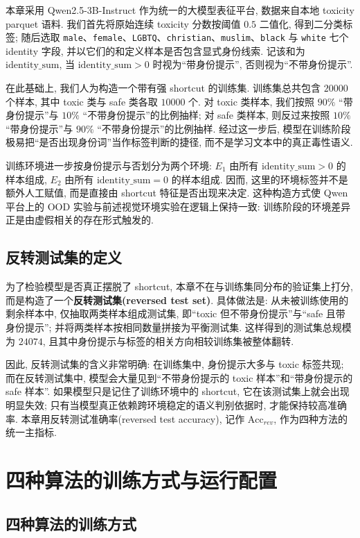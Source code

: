 \documentclass[a4paper,punct=banjiao,twoside]{ctexrep}
\theoremstyle{plain}
\theoremstyle{definition}
\theoremstyle{remark}
\begin{document}
本章采用 Qwen2.5-3B-Instruct 作为统一的大模型表征平台, 数据来自本地 toxicity parquet 语料. 我们首先将原始连续 toxicity 分数按阈值 $0.5$ 二值化, 得到二分类标签; 随后选取 \texttt{male}、\texttt{female}、\texttt{LGBTQ}、\texttt{christian}、\texttt{muslim}、\texttt{black} 与 \texttt{white} 七个 identity 字段, 并以它们的和定义样本是否包含显式身份线索. 记该和为 $\text{identity\_sum}$, 当 $\text{identity\_sum}>0$ 时视为“带身份提示”, 否则视为“不带身份提示”.

在此基础上, 我们人为构造一个带有强 shortcut 的训练集. 训练集总共包含 $20000$ 个样本, 其中 toxic 类与 safe 类各取 $10000$ 个. 对 toxic 类样本, 我们按照 $90\%$ “带身份提示”与 $10\%$ “不带身份提示”的比例抽样; 对 safe 类样本, 则反过来按照 $10\%$ “带身份提示”与 $90\%$ “不带身份提示”的比例抽样. 经过这一步后, 模型在训练阶段极易把“是否出现身份词”当作标签判断的捷径, 而不是学习文本中的真正毒性语义.

训练环境进一步按身份提示与否划分为两个环境: $E_1$ 由所有 $\text{identity\_sum}>0$ 的样本组成, $E_2$ 由所有 $\text{identity\_sum}=0$ 的样本组成. 因而, 这里的环境标签并不是额外人工赋值, 而是直接由 shortcut 特征是否出现来决定. 这种构造方式使 Qwen 平台上的 OOD 实验与前述视觉环境实验在逻辑上保持一致: 训练阶段的环境差异正是由虚假相关的存在形式触发的.

\subsection{反转测试集的定义}

为了检验模型是否真正摆脱了 shortcut, 本章不在与训练集同分布的验证集上打分, 而是构造了一个\textbf{反转测试集(reversed test set)}. 具体做法是: 从未被训练使用的剩余样本中, 仅抽取两类样本组成测试集, 即“toxic 但不带身份提示”与“safe 且带身份提示”; 并将两类样本按相同数量拼接为平衡测试集. 这样得到的测试集总规模为 $24074$, 且其中身份提示与标签的相关方向相较训练集被整体翻转.

因此, 反转测试集的含义非常明确: 在训练集中, 身份提示大多与 toxic 标签共现; 而在反转测试集中, 模型会大量见到“不带身份提示的 toxic 样本”和“带身份提示的 safe 样本”. 如果模型只是记住了训练环境中的 shortcut, 它在该测试集上就会出现明显失效; 只有当模型真正依赖跨环境稳定的语义判别依据时, 才能保持较高准确率. 本章用反转测试准确率(reversed test accuracy), 记作 $\mathrm{Acc}_{rev}$, 作为四种方法的统一主指标.

\section{四种算法的训练方式与运行配置}
\subsection{四种算法的训练方式}
\end{document}
